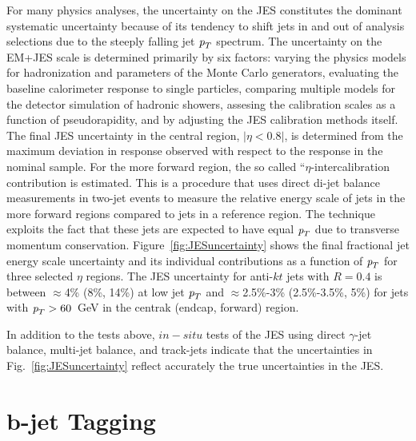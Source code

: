 \begin{itemize}
For many physics analyses, the uncertainty on the JES constitutes the dominant systematic uncertainty because of its tendency to shift jets in and out of analysis selections due to the steeply falling jet ${\emph{p}_{T}}$ spectrum. The uncertainty on the EM+JES scale  is determined primarily by six factors:  varying the physics models for hadronization and parameters of the Monte Carlo generators, evaluating the baseline calorimeter response to single particles, comparing multiple models for the detector simulation of hadronic showers, assesing the calibration scales as a function of pseudorapidity, and by adjusting the JES calibration methods itself.  The final JES uncertainty in the central region, $|\eta < 0.8|$, is determined from the maximum deviation in response observed with respect to the response in the nominal sample.  For the more forward region, the so called ``$\eta$-intercalibration contribution is estimated. This is a procedure that uses direct di-jet balance measurements in two-jet events to measure the relative energy scale of jets in the more forward regions compared to jets in a reference region. The technique exploits the fact that these jets are expected to have equal ${\emph{p}_{T}}$ due to transverse momentum conservation. Figure~\ref{fig:JESuncertainty}  shows the final fractional jet energy scale uncertainty and its individual contributions as a function of ${\emph{p}_{T}}$ for three selected $\eta$ regions. The JES uncertainty for anti-$kt$ jets with $R = 0.4$ is between $\approx$4\% (8\%, 14\%) at low jet ${\emph{p}_{T}}$ and $\approx$2.5\%-3\% (2.5\%-3.5\%, 5\%) for jets with ${\emph{p}_{T}} > 60$~GeV in the centrak (endcap, forward) region.

In addition to the tests above, $in-situ$ tests of the JES using direct $\gamma$-jet balance, multi-jet balance, and track-jets indicate that the uncertainties in Fig.~\ref{fig:JESuncertainty} reflect accurately the true uncertainties in the JES.  


\section{ $\bm b$-jet Tagging}\label{sec:btagging}



\end{itemize}
